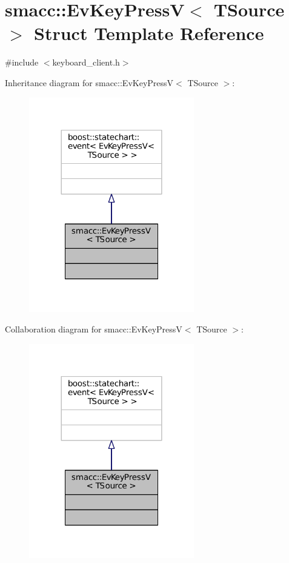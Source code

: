\hypertarget{structsmacc_1_1EvKeyPressV}{}\section{smacc\+:\+:Ev\+Key\+PressV$<$ T\+Source $>$ Struct Template Reference}
\label{structsmacc_1_1EvKeyPressV}


{\ttfamily \#include $<$keyboard\+\_\+client.\+h$>$}



Inheritance diagram for smacc\+:\+:Ev\+Key\+PressV$<$ T\+Source $>$\+:
\nopagebreak
\begin{figure}[H]
\begin{center}
\leavevmode
\includegraphics[width=204pt]{structsmacc_1_1EvKeyPressV__inherit__graph}
\end{center}
\end{figure}


Collaboration diagram for smacc\+:\+:Ev\+Key\+PressV$<$ T\+Source $>$\+:
\nopagebreak
\begin{figure}[H]
\begin{center}
\leavevmode
\includegraphics[width=204pt]{structsmacc_1_1EvKeyPressV__coll__graph}
\end{center}
\end{figure}


